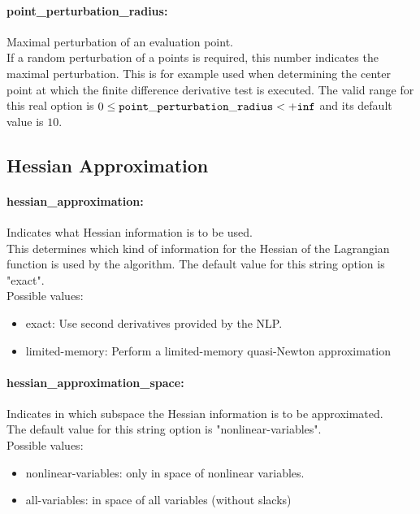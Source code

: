 \paragraph{point\_perturbation\_radius:}\label{sec:point_perturbation_radius} Maximal perturbation of an evaluation point. $\;$ \\
 If a random perturbation of a points is required,
this number indicates the maximal perturbation. 
This is for example used when determining the
center point at which the finite difference
derivative test is executed. The valid range for this real option is 
$0 \le {\tt point\_perturbation\_radius } <  {\tt +inf}$
and its default value is $10$.


\subsection{Hessian Approximation}
\label{sec:Hessian_Approximation}
\paragraph{hessian\_approximation:}\label{sec:hessian_approximation} Indicates what Hessian information is to be used. $\;$ \\
 This determines which kind of information for the
Hessian of the Lagrangian function is used by the
algorithm.
The default value for this string option is "exact".
\\ 
Possible values:
\begin{itemize}
   \item exact: Use second derivatives provided by the NLP.
   \item limited-memory: Perform a limited-memory quasi-Newton
approximation
\end{itemize}

\paragraph{hessian\_approximation\_space:}\label{sec:hessian_approximation_space} Indicates in which subspace the Hessian information is to be approximated. $\;$ \\

The default value for this string option is "nonlinear-variables".
\\ 
Possible values:
\begin{itemize}
   \item nonlinear-variables: only in space of nonlinear variables.
   \item all-variables: in space of all variables (without slacks)
\end{itemize}

